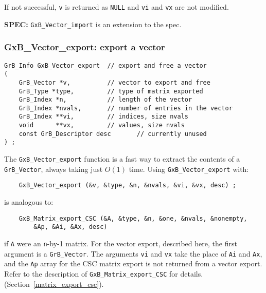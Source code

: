 \documentclass[12pt]{article}
\begin{document}
If not successful, \verb'v' is returned as \verb'NULL' and \verb'vi' and
\verb'vx' are not modified.

\begin{spec}
{\bf SPEC:} \verb'GxB_Vector_import' is an extension to the spec.
\end{spec}

\newpage
\subsubsection{{\sf GxB\_Vector\_export:}        export a vector}
\label{vector_export}

\begin{mdframed}[userdefinedwidth=6in]
{\footnotesize
\begin{verbatim}
GrB_Info GxB_Vector_export  // export and free a vector
(
    GrB_Vector *v,          // vector to export and free
    GrB_Type *type,         // type of matrix exported
    GrB_Index *n,           // length of the vector
    GrB_Index *nvals,       // number of entries in the vector
    GrB_Index **vi,         // indices, size nvals
    void      **vx,         // values, size nvals
    const GrB_Descriptor desc       // currently unused
) ;
\end{verbatim}
} \end{mdframed}

The \verb'GxB_Vector_export' function is a fast way to extract the contents of
a \verb'GrB_Vector', always taking just $O(1)$ time.  Using
\verb'GxB_Vector_export' with:

{\footnotesize
\begin{verbatim}
    GxB_Vector_export (&v, &type, &n, &nvals, &vi, &vx, desc) ;
\end{verbatim}}

is analogous to:

{\footnotesize
\begin{verbatim}
    GxB_Matrix_export_CSC (&A, &type, &n, &one, &nvals, &nonempty,
        &Ap, &Ai, &Ax, desc)
\end{verbatim}}

\noindent
if \verb'A' were an \verb'n'-by-1 matrix.  For the vector export, described
here, the first argument is a \verb'GrB_Vector'.  The arguments \verb'vi' and
\verb'vx' take the place of \verb'Ai' and \verb'Ax', and the \verb'Ap' array
for the CSC matrix export is not returned from a vector export.  Refer to the
description of \verb'GxB_Matrix_export_CSC' for details.
(Section~\ref{matrix_export_csc}).
\end{document}
